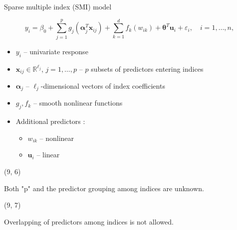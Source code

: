 \documentclass[
  12pt,
  ignorenonframetext,
  aspectratio=169,
]{beamer}
\begin{document}
\begin{frame}{Sparse multiple index (SMI) model}
\label{sparse-multiple-index-smi-model-2}
\begin{block}{}
$$y_{i} = \beta_{0} + \sum_{j = 1}^{p}g_{j}(\bm{\alpha}_{j}^{T}\bm{x}_{ij}) + \sum_{k = 1}^{d}f_{k}(w_{ik}) + \bm{\theta}^{T}\bm{u}_{i} + \varepsilon_{i}, \quad i = 1, \dots, n,$$
\end{block}

\begin{itemize}
  \item \small \color{black} $y_{i}$ -- \color{violet} univariate response
  \item \small \color{black} $\bm{x}_{ij} \in \mathbb{R}^{\ell_{j}}$, $j = 1, \dots, p$ -- \color{violet} $p$ subsets of predictors entering indices
  \item \small \color{black} $\bm{\alpha}_{j}$ -- \color{violet} $\ell_{j}$-dimensional vectors of index coefficients
  \item \small \color{black} $g_{j}, f_{k}$ -- \color{violet} smooth nonlinear functions
  \item \small \color{black} Additional predictors :
    \begin{itemize}
      \item \small $w_{ik}$  --   \color{violet} nonlinear 
      \item \small \color{black} $\bm{u}_{i}$  --   \color{violet} linear
    \end{itemize}
\end{itemize}

\begin{textblock}{5.5}(9, 6)
\fontsize{11}{12}\sf
\begin{alertblock}{}
\scriptsize Both "p" and the predictor grouping among indices are unknown.
\end{alertblock}
\end{textblock}

\begin{textblock}{5.5}(9, 7)
\fontsize{11}{12}\sf
\begin{alertblock}{}
\scriptsize Overlapping of predictors among indices is not allowed.
\end{alertblock}
\end{textblock}
\end{frame}
\end{document}
